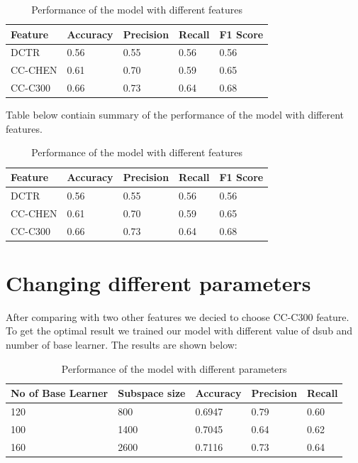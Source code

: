 \begin{table}[H]
    \centering
    \begin{tabular}{|l|l|l|l|l|}
    \hline
    Feature & Accuracy & Precision & Recall & F1 Score \\ \hline
    DCTR    & 0.56   & 0.55    & 0.56 & 0.56  \\ \hline
    CC-CHEN & 0.61     & 0.70      & 0.59   & 0.65     \\ \hline
    CC-C300 & 0.66     & 0.73      & 0.64   & 0.68     \\ \hline
    \end{tabular}
    \caption{Performance of the model with different features}
\end{table}
\begin{flushleft}
    Table below contiain summary of the performance of the model with different features.
    \end{flushleft}
    \begin{table}[H]
        \centering
        \begin{tabular}{|l|l|l|l|l|}
        \hline
        Feature & Accuracy & Precision & Recall & F1 Score \\ \hline
        DCTR    & 0.56   & 0.55    & 0.56 & 0.56  \\ \hline
        CC-CHEN & 0.61     & 0.70      & 0.59   & 0.65     \\ \hline
        CC-C300 & 0.66     & 0.73      & 0.64   & 0.68     \\ \hline
        \end{tabular}
        \caption{Performance of the model with different features}
    \end{table}
\clearpage
\section{Changing different parameters}
After comparing with two other features we decied to choose CC-C300 feature. To get the optimal result we trained our model with different value of dsub and number of base learner. The results are shown below:
\begin{table}[H]
    \centering
    \begin{tabular}{|l|l|l|l|l|}
    \hline
    No of  Base Learner & Subspace size & Accuracy & Precision & Recall \\ \hline
    120                 & 800           & 0.6947   &    0.79       &  0.60      \\ \hline
    100                 & 1400         & 0.7045   &    0.64       &   0.62     \\ \hline
    160                 & 2600         & 0.7116   &    0.73       &    0.64    \\ \hline
    \end{tabular}
    \caption{Performance of the model with different parameters}
\end{table}

